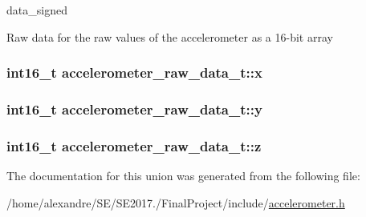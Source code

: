 data\+\_\+signed 

Raw data for the raw values of the accelerometer as a 16-\/bit array 
\subsubsection[{\texorpdfstring{x}{x}}]{\setlength{\rightskip}{0pt plus 5cm}int16\+\_\+t accelerometer\+\_\+raw\+\_\+data\+\_\+t\+::x}\hypertarget{unionaccelerometer__raw__data__t_a735f5a9c1185e9fbe97889444d14f578}{}\label{unionaccelerometer__raw__data__t_a735f5a9c1185e9fbe97889444d14f578}
\subsubsection[{\texorpdfstring{y}{y}}]{\setlength{\rightskip}{0pt plus 5cm}int16\+\_\+t accelerometer\+\_\+raw\+\_\+data\+\_\+t\+::y}\hypertarget{unionaccelerometer__raw__data__t_a722cb8e16ee4ef3aba5593b935e00a43}{}\label{unionaccelerometer__raw__data__t_a722cb8e16ee4ef3aba5593b935e00a43}
\subsubsection[{\texorpdfstring{z}{z}}]{\setlength{\rightskip}{0pt plus 5cm}int16\+\_\+t accelerometer\+\_\+raw\+\_\+data\+\_\+t\+::z}\hypertarget{unionaccelerometer__raw__data__t_a86a93d9e4affc3dc0156eff12dc29c30}{}\label{unionaccelerometer__raw__data__t_a86a93d9e4affc3dc0156eff12dc29c30}


The documentation for this union was generated from the following file\+:\begin{DoxyCompactItemize}
\item 
/home/alexandre/\+S\+E/\+S\+E2017./\+Final\+Project/include/\hyperlink{accelerometer_8h}{accelerometer.\+h}\end{DoxyCompactItemize}
